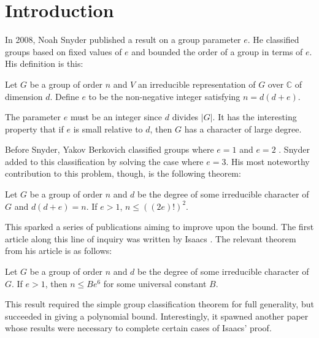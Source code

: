 \documentclass[main.tex]{subfiles}
\begin{document}
\chapter{Introduction}

In 2008, Noah Snyder \cite{snyderarticle} published a result on a group parameter $e$. He classified groups based on fixed values of $e$ and bounded the order of a group in terms of $e$. His definition is this:

\hss

\begin{definition}
Let $G$ be a group of order $n$ and $V$ an irreducible representation of $G$ over $\mathbb{C}$ of dimension $d$. Define $e$ to be the non-negative integer satisfying $n = d(d + e)$.
\end{definition}

\hss

The parameter $e$ must be an integer since $d$ divides $|G|$. It has the interesting property that if $e$ is small relative to $d$, then $G$ has a character of large degree.

Before Snyder, Yakov Berkovich classified groups where $e=1$ and $e=2$ \cite{berkovicharticle}. Snyder added to this classification by solving the case where $e=3$. His most noteworthy contribution to this problem, though, is the following theorem:

\hss

\begin{theorem}
Let $G$ be a group of order $n$ and $d$ be the degree of some irreducible character of $G$ and $d(d+e) = n$. If $e > 1$, $n \le ((2e)!)^2$.
\end{theorem}

\hss

This sparked a series of publications aiming to improve upon the bound. The first article along this line of inquiry was written by Isaacs \cite{isaacsarticle}. The relevant theorem from his article is as follows:

\hss

\begin{theorem} Let $G$ be a group of order $n$ and $d$ be the degree of some irreducible character of $G$. If $e > 1$, then $n \le Be^6$ for some universal constant $B$.
\end{theorem}

\hss

This result required the simple group classification theorem for full generality, but succeeded in giving a polynomial bound. Interestingly, it spawned another paper \cite{larsenmalletieparticle} whose results were necessary to complete certain cases of Isaacs' proof.
\end{document}
